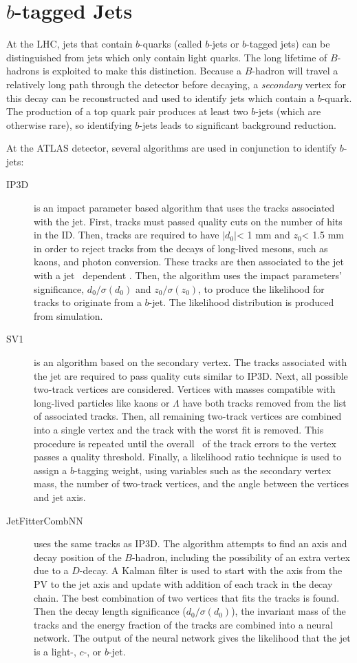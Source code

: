 \section{$b$-tagged Jets}
At the LHC, jets that contain $b$-quarks (called $b$-jets or $b$-tagged jets) can be distinguished from jets which only contain light quarks\cite{btagcom,btagptrel}. The long lifetime of $B$-hadrons is exploited to make this distinction. Because a $B$-hadron will travel a relatively long path through the detector before decaying, a \emph{secondary} vertex for this decay can be reconstructed and used to identify jets which contain a $b$-quark. The production of a top quark pair produces at least two $b$-jets (which are otherwise rare), so identifying $b$-jets leads to significant background reduction. 

At the ATLAS detector, several algorithms are used in conjunction to identify $b$-jets:
\begin{description}
\item[IP3D] is an impact parameter based algorithm that uses the tracks associated with the jet. First, tracks must passed quality cuts on the number of hits in the ID. Then, tracks are required to have $|d_0|$< 1 mm and $z_0$< 1.5 mm in order to reject tracks from the decays of long-lived mesons, such as kaons, and photon conversion. These tracks are then associated to the jet with a jet \pt\ dependent \dR. Then, the algorithm uses the impact parameters' significance, $d_0/\sigma(d_0)$ and $z_0/\sigma(z_0)$, to produce the likelihood for tracks to originate from a $b$-jet. The likelihood distribution is produced from simulation.
\item[SV1] is an algorithm based on the secondary vertex. The tracks associated with the jet are required to pass quality cuts similar to IP3D. Next, all possible two-track vertices are considered. Vertices with masses compatible with long-lived particles like kaons or $\Lambda$ have both tracks removed from the list of associated tracks. Then, all remaining two-track vertices are combined into a single vertex and the track with the worst fit is removed. This procedure is repeated until the overall \chisq\ of the track errors to the vertex passes a quality threshold. Finally, a likelihood ratio technique is used to assign a $b$-tagging weight, using variables such as the secondary vertex mass, the number of two-track vertices, and the angle between the vertices and jet axis.

\item[JetFitterCombNN] uses the same tracks as IP3D. The algorithm attempts to find an axis and decay position of the $B$-hadron, including the possibility of an extra vertex due to a $D$-decay. A Kalman filter is used to start with the axis from the PV to the jet axis and update with addition of each track in the decay chain. The best combination of two vertices that fits the tracks is found. Then the decay length significance ($d_0/\sigma(d_0)$), the invariant mass of the tracks and the energy fraction of the tracks are combined into a neural network. The output of the neural network gives the likelihood that the jet is a light-, $c$-, or $b$-jet.
\end{description}




